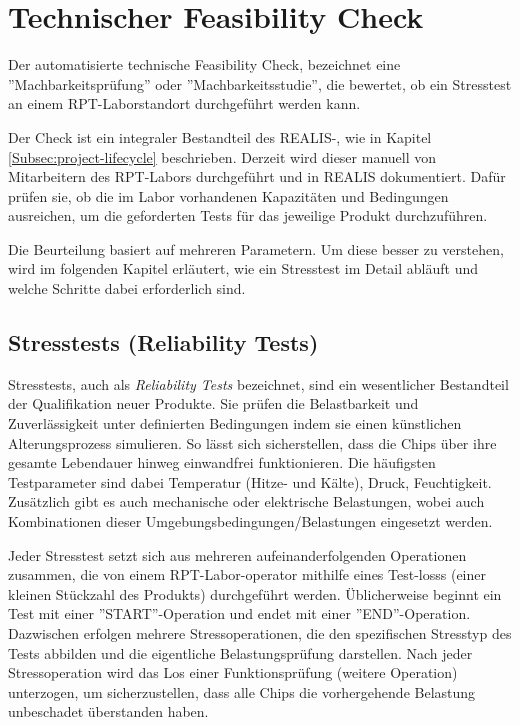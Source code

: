 \section{Technischer Feasibility Check}
Der automatisierte technische Feasibility Check, bezeichnet eine ''Machbarkeitsprüfung'' oder ''Machbarkeitsstudie'', die bewertet, ob ein Stresstest an einem \gls{RPT}-Laborstandort durchgeführt werden kann.

Der Check ist ein integraler Bestandteil des \gls{REALIS}-, wie in Kapitel \ref{Subsec:project-lifecycle} beschrieben. Derzeit wird dieser manuell von Mitarbeitern des \gls{RPT}-Labors durchgeführt und in \gls{REALIS} dokumentiert. Dafür prüfen sie, ob die im Labor vorhandenen Kapazitäten und Bedingungen ausreichen, um die geforderten Tests für das jeweilige Produkt durchzuführen.

Die Beurteilung basiert auf mehreren Parametern. Um diese besser zu verstehen, wird im folgenden Kapitel erläutert, wie ein Stresstest im Detail abläuft und welche Schritte dabei erforderlich sind.


\subsection{Stresstests (Reliability Tests)}

Stresstests, auch als \textit{Reliability Tests} bezeichnet, sind ein wesentlicher Bestandteil der Qualifikation neuer Produkte. Sie prüfen die Belastbarkeit und Zuverlässigkeit unter definierten Bedingungen indem sie einen künstlichen Alterungsprozess simulieren. So lässt sich sicherstellen, dass die Chips über ihre gesamte Lebendauer hinweg einwandfrei funktionieren. Die häufigsten Testparameter sind dabei Temperatur (Hitze- und Kälte), Druck, Feuchtigkeit. Zusätzlich gibt es auch mechanische oder elektrische Belastungen, wobei auch Kombinationen dieser Umgebungsbedingungen/Belastungen eingesetzt werden.

Jeder Stresstest setzt sich aus mehreren aufeinanderfolgenden Operationen zusammen, die von einem \gls{RPT}-Labor-\gls{operator} mithilfe eines Test-\glspl{los}s (einer kleinen Stückzahl des Produkts) durchgeführt werden. Üblicherweise beginnt ein Test mit einer ''START''-Operation und endet mit einer ''END''-Operation. Dazwischen erfolgen mehrere Stressoperationen, die den spezifischen Stresstyp des Tests abbilden und die eigentliche Belastungsprüfung darstellen. Nach jeder Stressoperation wird das Los einer Funktionsprüfung (weitere Operation) unterzogen, um sicherzustellen, dass alle Chips die vorhergehende Belastung unbeschadet überstanden haben.

